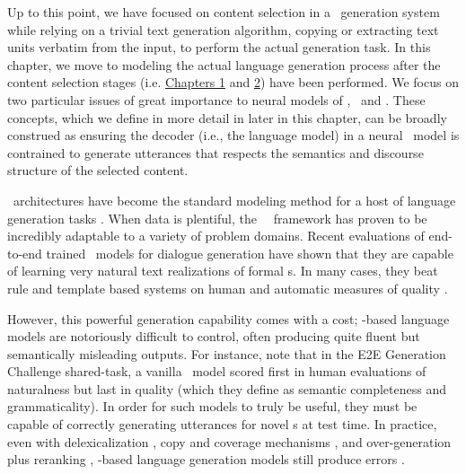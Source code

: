 Up to this point, we have  focused on content selection
in a \texttotext~generation system
while relying on a trivial text generation algorithm, copying or extracting text units verbatim from the input, to perform the actual generation task.
In this chapter, we move to modeling the actual 
language generation process after the content selection stages (i.e. \hyperref[dlsal]{Chapters 1} and \hyperref[mlsal]{2}) have been performed. We focus on two particular issues of great 
importance to 
neural models of \naturallanguagegeneration, \faithfulness~and \control.
These concepts, which we define in more detail in later in this chapter,
can be broadly
construed as ensuring the decoder (i.e., the language model) 
in a neural \naturallanguagegeneration~model is contrained to generate utterances
that respects the 
semantics and discourse structure of the selected content.


\Deeplearning~architectures have become the standard modeling method for a
host of language generation tasks \citep{all,of,the,things}. When data is
plentiful, the \deeplearning~\sequencetosequence~framework has proven to be
incredibly adaptable to a variety of problem domains.  Recent evaluations of
end-to-end trained \deeplearning~models for dialogue generation have shown
that they are capable of learning very natural text realizations of formal
\meaningrepresentation s. In many cases, they  beat
rule and template based systems on human and automatic measures of quality
\citep{dusek2020}.
 


However, this powerful generation capability comes with a cost;
\deeplearning-based language models are notoriously difficult to control,
often producing quite fluent but  semantically misleading outputs. For
instance, \citet{dusek2020} note that in the E2E Generation Challenge
shared-task, a vanilla \sequencetosequence~model scored first in human
evaluations of naturalness but last in quality (which they define as semantic
completeness and grammaticality).  In order for such models to truly be
useful, they must be capable of correctly generating utterances for novel
\meaningrepresentation s at test time.  In practice, even with
delexicalization \citep{dusek2016,juraska2018}, copy and coverage mechanisms
\citep{elder2018}, and over-generation plus reranking
\citep{dusek2016,juraska2018}, \deeplearning-based language generation models
still produce errors \citep{dusek2020}.



